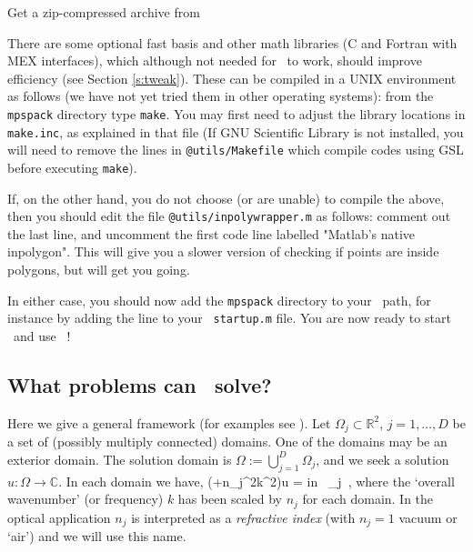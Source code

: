 \documentclass[12pt]{article}
\begin{document}
\item Get a zip-compressed archive from

\een
There are some optional fast basis and other math libraries
(C and Fortran with MEX interfaces), which although not needed for
\mpspack\ to work, should improve efficiency (see Section \ref{s:tweak}).
These can be compiled in a UNIX environment as follows
(we have not yet tried them in other operating systems):
from the {\tt mpspack} directory type {\tt make}.
You may first need to adjust the library locations in {\tt make.inc},
as explained in that file
(If GNU Scientific Library \cite{GSL} is not installed,
you will need to remove the lines in {\tt @utils/Makefile} which
compile codes using GSL before executing {\tt make}).

If, on the other hand, you do not choose (or are unable) to compile the
above, then you should edit the file {\tt @utils/inpolywrapper.m} as follows:
comment out the last line, and uncomment the
first code line labelled "Matlab's native inpolygon". This will give you
a slower version of checking if points are inside polygons, but will get
you going.

In either case, you should now add the {\tt mpspack}
directory to your \matlab\ path, for instance by adding the line
to your \matlab\ {\tt startup.m} file.
You are now ready to start \matlab\ and use \mpspack\ !


\subsection{What problems can \mpspack\ solve?}
\label{s:bvp}

Here we give a
general framework (for examples see \cite{mfs,polygonscatt}). 
Let $\Omega_j \subset \mathbb{R}^2$, $j=1,\ldots,D$ be a set of
(possibly multiply connected) domains. One of the domains may
be an exterior domain.
The solution domain is $\Omega:=\bigcup_{j=1}^D \Omega_j$,
and we seek a solution $u:\Omega \to\mathbb{C}$.
In each domain we have,
\be
(\Delta+n_j^2k^2)u\; = \qquad \mbox{in } \Omega_j~,
\label{e:helmj}
\ee
where the `overall wavenumber' (or frequency) $k$ has been scaled by
$n_j$ for each domain. In the optical application $n_j$ is interpreted
as a {\em refractive index} (with $n_j=1$ vacuum or `air') and we
will use this name.
\end{document}
